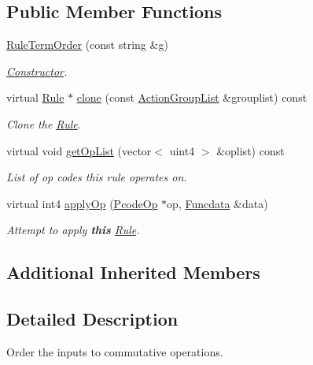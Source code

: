 \subsection*{Public Member Functions}
\begin{DoxyCompactItemize}
\item 
\mbox{\hyperlink{class_rule_term_order_a2df369bf247f644ca3e52903e7696d1d}{Rule\+Term\+Order}} (const string \&g)
\begin{DoxyCompactList}\small\item\em \mbox{\hyperlink{class_constructor}{Constructor}}. \end{DoxyCompactList}\item 
virtual \mbox{\hyperlink{class_rule}{Rule}} $\ast$ \mbox{\hyperlink{class_rule_term_order_a02f5abd73f44211860e5cdf7f6f9d554}{clone}} (const \mbox{\hyperlink{class_action_group_list}{Action\+Group\+List}} \&grouplist) const
\begin{DoxyCompactList}\small\item\em Clone the \mbox{\hyperlink{class_rule}{Rule}}. \end{DoxyCompactList}\item 
virtual void \mbox{\hyperlink{class_rule_term_order_a2d60614aa2007130a4520cc782f8fdc7}{get\+Op\+List}} (vector$<$ uint4 $>$ \&oplist) const
\begin{DoxyCompactList}\small\item\em List of op codes this rule operates on. \end{DoxyCompactList}\item 
virtual int4 \mbox{\hyperlink{class_rule_term_order_a3f3c26d28f966bd5cbc24c056f0c324b}{apply\+Op}} (\mbox{\hyperlink{class_pcode_op}{Pcode\+Op}} $\ast$op, \mbox{\hyperlink{class_funcdata}{Funcdata}} \&data)
\begin{DoxyCompactList}\small\item\em Attempt to apply {\bfseries{this}} \mbox{\hyperlink{class_rule}{Rule}}. \end{DoxyCompactList}\end{DoxyCompactItemize}
\subsection*{Additional Inherited Members}


\subsection{Detailed Description}
Order the inputs to commutative operations. 

